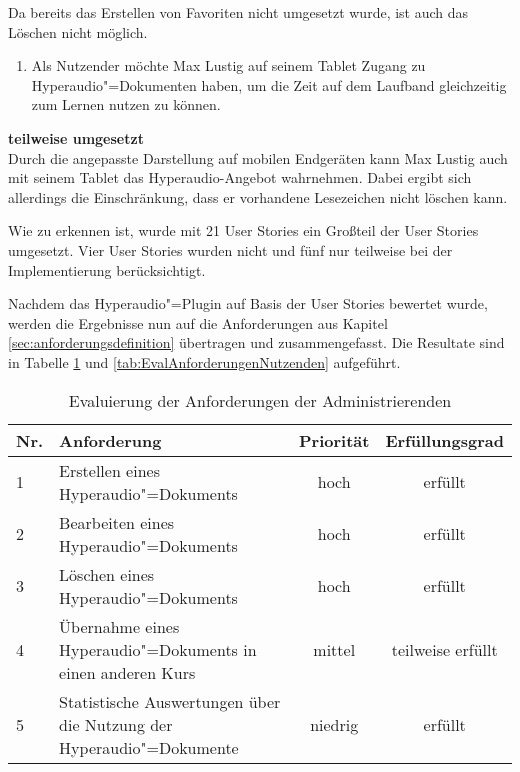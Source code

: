 Da bereits das Erstellen von Favoriten nicht umgesetzt wurde, ist auch das Löschen nicht möglich.
\vspace{0.25cm}
\begin{enumerate}[resume*]
\item \label{US-Zeit-Mobil-Eval} Als Nutzender möchte Max Lustig auf seinem Tablet Zugang zu Hyperaudio"=Dokumenten haben, um die Zeit auf dem Laufband gleichzeitig zum Lernen nutzen zu können.
\end{enumerate}
\vspace{-0.1cm}
\textbf{teilweise umgesetzt}\\
Durch die angepasste Darstellung auf mobilen Endgeräten kann Max Lustig auch mit seinem Tablet das Hyperaudio-Angebot wahrnehmen. Dabei ergibt sich allerdings die Einschränkung, dass er vorhandene Lesezeichen nicht löschen kann.

Wie zu erkennen ist, wurde mit 21 User Stories ein Großteil der User Stories umgesetzt. Vier User Stories wurden nicht und fünf nur teilweise bei der Implementierung berücksichtigt.

Nachdem das Hyperaudio"=Plugin auf Basis der User Stories bewertet wurde, werden die Ergebnisse nun auf die Anforderungen aus Kapitel \ref{sec:anforderungsdefinition} übertragen und zusammengefasst. Die Resultate sind in Tabelle \ref{tab:EvalAnforderungenAdministrierenden} und \ref{tab:EvalAnforderungenNutzenden} aufgeführt.

\begin{table}[!ht]
\def\arraystretch{1.4}
 \begin{tabularx}{\textwidth}{lXcc}      
    \hline
    Nr. & Anforderung & Priorität & Erfüllungsgrad
    \\\hline
    1 & Erstellen eines Hyperaudio"=Dokuments & hoch & erfüllt\\
    2 & Bearbeiten eines Hyperaudio"=Dokuments & hoch & erfüllt\\
    3 & Löschen eines Hyperaudio"=Dokuments & hoch & erfüllt\\
    4 & Übernahme eines Hyperaudio"=Dokuments in einen anderen Kurs & mittel & teilweise erfüllt\\
    5 & Statistische Auswertungen über die Nutzung der Hyperaudio"=Dokumente & niedrig & erfüllt\\
    \hline
    \end{tabularx}
    \caption{Evaluierung der Anforderungen der Administrierenden}
\label{tab:EvalAnforderungenAdministrierenden}
\end{table}

